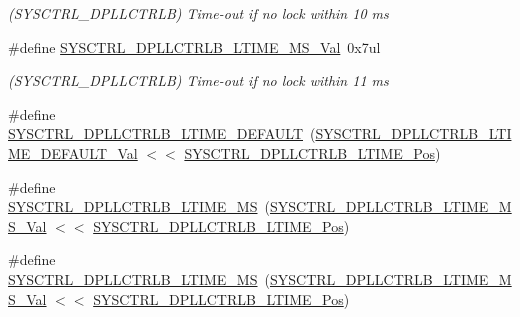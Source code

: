 \begin{DoxyCompactItemize}
\begin{DoxyCompactList}\small\item\em (S\+Y\+S\+C\+T\+R\+L\+\_\+\+D\+P\+L\+L\+C\+T\+R\+LB) Time-\/out if no lock within 10 ms \end{DoxyCompactList}\item 
\#define \mbox{\hyperlink{group___s_a_m_d21___s_y_s_c_t_r_l_gaf5cddfabfd94b03e50ee4fe0a2b0b390}{S\+Y\+S\+C\+T\+R\+L\+\_\+\+D\+P\+L\+L\+C\+T\+R\+L\+B\+\_\+\+L\+T\+I\+M\+E\+\_\+M\+S\+\_\+\+Val}}~0x7ul
\begin{DoxyCompactList}\small\item\em (S\+Y\+S\+C\+T\+R\+L\+\_\+\+D\+P\+L\+L\+C\+T\+R\+LB) Time-\/out if no lock within 11 ms \end{DoxyCompactList}\item 
\#define \mbox{\hyperlink{group___s_a_m_d21___s_y_s_c_t_r_l_ga42d7bfdebd85c4bb1f249274d16477fa}{S\+Y\+S\+C\+T\+R\+L\+\_\+\+D\+P\+L\+L\+C\+T\+R\+L\+B\+\_\+\+L\+T\+I\+M\+E\+\_\+\+D\+E\+F\+A\+U\+LT}}~(\mbox{\hyperlink{group___s_a_m_d21___s_y_s_c_t_r_l_gae5f144f6fd5480d44176047d6bc6b32b}{S\+Y\+S\+C\+T\+R\+L\+\_\+\+D\+P\+L\+L\+C\+T\+R\+L\+B\+\_\+\+L\+T\+I\+M\+E\+\_\+\+D\+E\+F\+A\+U\+L\+T\+\_\+\+Val}} $<$$<$ \mbox{\hyperlink{group___s_a_m_d21___s_y_s_c_t_r_l_ga906665610facc5bdb428c5b237c15df5}{S\+Y\+S\+C\+T\+R\+L\+\_\+\+D\+P\+L\+L\+C\+T\+R\+L\+B\+\_\+\+L\+T\+I\+M\+E\+\_\+\+Pos}})
\item 
\#define \mbox{\hyperlink{group___s_a_m_d21___s_y_s_c_t_r_l_ga89ee423dee584ff8ef01c20217baf9d5}{S\+Y\+S\+C\+T\+R\+L\+\_\+\+D\+P\+L\+L\+C\+T\+R\+L\+B\+\_\+\+L\+T\+I\+M\+E\+\_\+MS}}~(\mbox{\hyperlink{group___s_a_m_d21___s_y_s_c_t_r_l_ga3bfd9406004834e15e599a252dc43e45}{S\+Y\+S\+C\+T\+R\+L\+\_\+\+D\+P\+L\+L\+C\+T\+R\+L\+B\+\_\+\+L\+T\+I\+M\+E\+\_\+M\+S\+\_\+\+Val}} $<$$<$ \mbox{\hyperlink{group___s_a_m_d21___s_y_s_c_t_r_l_ga906665610facc5bdb428c5b237c15df5}{S\+Y\+S\+C\+T\+R\+L\+\_\+\+D\+P\+L\+L\+C\+T\+R\+L\+B\+\_\+\+L\+T\+I\+M\+E\+\_\+\+Pos}})
\item 
\#define \mbox{\hyperlink{group___s_a_m_d21___s_y_s_c_t_r_l_gaf23e0554f378e25492acb692ed8de2dd}{S\+Y\+S\+C\+T\+R\+L\+\_\+\+D\+P\+L\+L\+C\+T\+R\+L\+B\+\_\+\+L\+T\+I\+M\+E\+\_\+MS}}~(\mbox{\hyperlink{group___s_a_m_d21___s_y_s_c_t_r_l_gaba799a6835775b1c2a20cd1e4087d582}{S\+Y\+S\+C\+T\+R\+L\+\_\+\+D\+P\+L\+L\+C\+T\+R\+L\+B\+\_\+\+L\+T\+I\+M\+E\+\_\+M\+S\+\_\+\+Val}} $<$$<$ \mbox{\hyperlink{group___s_a_m_d21___s_y_s_c_t_r_l_ga906665610facc5bdb428c5b237c15df5}{S\+Y\+S\+C\+T\+R\+L\+\_\+\+D\+P\+L\+L\+C\+T\+R\+L\+B\+\_\+\+L\+T\+I\+M\+E\+\_\+\+Pos}})
$$
\end{DoxyCompactItemize}
